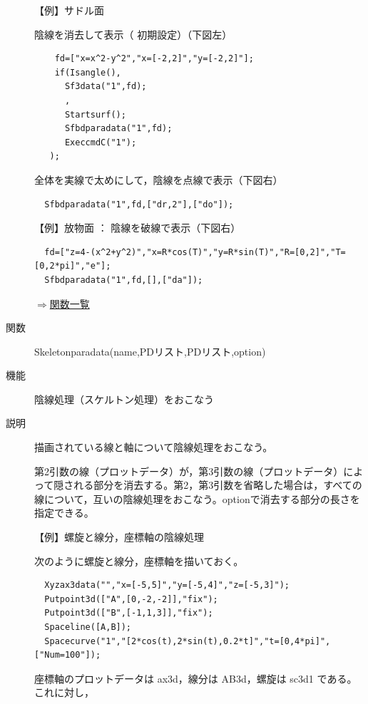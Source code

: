 \documentclass[papersize,a4paper,12pt,uplatex]{jsarticle}
\begin{document}
\begin{description}
\vspace{\baselineskip}
【例】サドル面

陰線を消去して表示（ 初期設定）（下図左）
\begin{verbatim}
    fd=["x=x^2-y^2","x=[-2,2]","y=[-2,2]"];
    if(Isangle(),
      Sf3data("1",fd);
      ,
      Startsurf();
      Sfbdparadata("1",fd);
      ExeccmdC("1");
   );
\end{verbatim}
全体を実線で太めにして，陰線を点線で表示（下図右）
\begin{verbatim}
  Sfbdparadata("1",fd,["dr,2"],["do"]);
\end{verbatim}
      \begin{center}     \end{center}

【例】放物面  ：  陰線を破線で表示（下図右）
\begin{verbatim}
  fd=["z=4-(x^2+y^2)","x=R*cos(T)","y=R*sin(T)","R=[0,2]","T=[0,2*pi]","e"];
  Sfbdparadata("1",fd,[],["da"]);
\end{verbatim}
      \begin{center}    \end{center}


\begin{flushright} \hyperlink{functionlist}{$\Rightarrow$関数一覧}\end{flushright}

\hypertarget{skeletonparadata}{}
\item[関数]  Skeletonparadata(name,PDリスト,PDリスト,option)
\item[機能]  陰線処理（スケルトン処理）をおこなう
\item[説明]  描画されている線と軸について陰線処理をおこなう。

第2引数の線（プロットデータ）が，第3引数の線（プロットデータ）によって隠される部分を消去する。第2，第3引数を省略した場合は，すべての線について，互いの陰線処理をおこなう。optionで消去する部分の長さを指定できる。

\vspace{\baselineskip}
【例】螺旋と線分，座標軸の陰線処理

次のように螺旋と線分，座標軸を描いておく。
\begin{verbatim}
  Xyzax3data("","x=[-5,5]","y=[-5,4]","z=[-5,3]");
  Putpoint3d(["A",[0,-2,-2]],"fix");
  Putpoint3d(["B",[-1,1,3]],"fix");
  Spaceline([A,B]);
  Spacecurve("1","[2*cos(t),2*sin(t),0.2*t]","t=[0,4*pi]",["Num=100"]);
\end{verbatim}
座標軸のプロットデータは ax3d，線分は AB3d，螺旋は sc3d1 である。これに対し，


\end{description}
\end{document}
